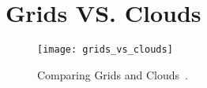 \chapter{Grids VS. Clouds} \label{chap:ap1}

\begin{figure}[t]
  \begin{center}
    \leavevmode
    \texttt{[image: grids\_vs\_clouds]}
    \caption{Comparing Grids and Clouds~\cite{vaquero}.}
    \label{fig:grids_vs_clouds}
  \end{center}
\end{figure}

